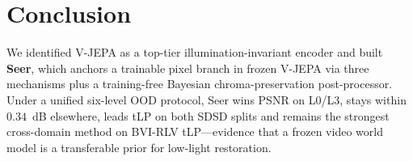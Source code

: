 \section{Conclusion}\label{sec:conclusion}

We identified V-JEPA as a top-tier illumination-invariant encoder and built \textbf{Seer}, which anchors a trainable pixel branch in frozen V-JEPA via three mechanisms plus a training-free Bayesian chroma-preservation post-processor. Under a unified six-level OOD protocol, Seer wins PSNR on L0/L3, stays within $0.34$~dB elsewhere, leads tLP on both SDSD splits and remains the strongest cross-domain method on BVI-RLV tLP---evidence that a frozen video world model is a transferable prior for low-light restoration.
